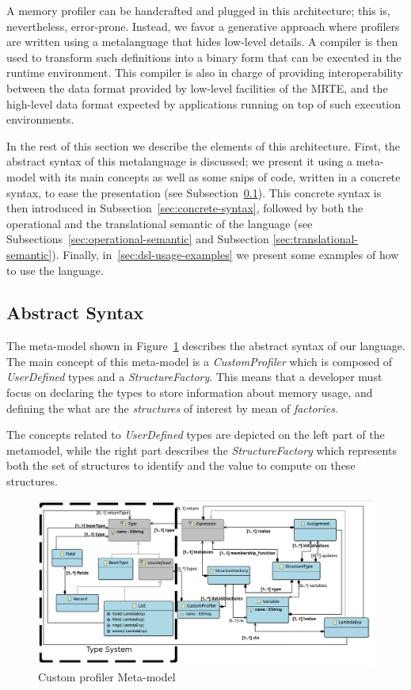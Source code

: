A memory profiler can be handcrafted and plugged in this architecture; this is, nevertheless, error-prone.
Instead, we favor a generative approach where profilers are written using a metalanguage that hides low-level details.
A compiler is then used to transform such definitions into a binary form that can be executed in the runtime environment.
This compiler is also in charge of providing interoperability between the data format provided by low-level facilities of the MRTE, and the high-level data format expected by applications running on top of such execution environments. 

In the rest of this section we describe the elements of this architecture.
First, the abstract syntax of this metalanguage is discussed; we present it using a meta-model with its main concepts as well as some snips of code, written in a concrete syntax, to ease the presentation (see Subsection~\ref{sec:abstract-syntax}).
This concrete syntax is then introduced in Subsection~\ref{sec:concrete-syntax}, followed by 
\ifoperationalSemanticsOn
both the operational and
\else
the
\fi
translational semantic of the language (see 
\ifoperationalSemanticsOn
Subsections~\ref{sec:operational-semantic} and
\else
Subsection
\fi
\ref{sec:translational-semantic}).
Finally, in~\ref{sec:dsl-usage-examples} we present some examples of how to use the language.


\subsection{Abstract Syntax}\label{sec:abstract-syntax}

The meta-model shown in Figure~\ref{fig:as} describes the abstract syntax of our language.
The main concept of this meta-model is a \textit{CustomProfiler} which is composed of \textit{UserDefined} types and a \textit{StructureFactory}.
This means that a developer must focus on declaring the types to store information about memory usage, and defining the what are the \textit{structures} of interest by mean of \textit{factories}.

The concepts related to \textit{UserDefined} types are depicted on the left part of the metamodel, while the right part describes the \textit{StructureFactory} which represents both the set of  structures to identify and the value to compute on these structures.

\begin{figure}
\centering
\includegraphics[width=0.93\linewidth]{chapter6/fig/AS}
\caption{Custom profiler Meta-model}
\label{fig:as}
\end{figure}


